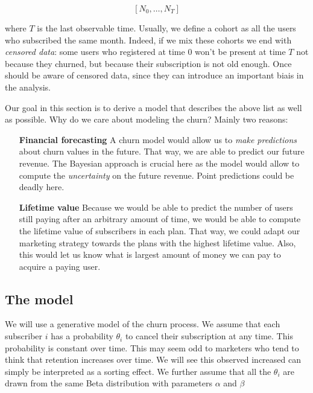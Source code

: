 \documentclass{tufte-book}
\begin{document}
\begin{equation}
  \left[N_0, \dots, N_T \right]
\end{equation}

where $T$ is the last observable time. Usually, we define a cohort as all the users who subscribed the same
month. Indeed, if we mix these cohorts we end with \textit{censored data}: some users who registered at time $0$
won't be present at time $T$ not because they churned, but because their subscription is not old enough. Once
should be aware of censored data, since they can introduce an important biais in the analysis.

Our goal in this section is to derive a model that describes the above list as well as possible. Why do we
care about modeling the churn? Mainly two reasons:

\begin{itemize}
  \item[\textbf{Financial forecasting}] A churn model would allow us to \textit{make predictions} about churn
    values in the future. That way, we are able to predict our future revenue. The Bayesian approach is
    crucial here as the model would allow to compute the \textit{uncertainty} on the future revenue. Point 
    predictions could be deadly here.
  \item[\textbf{Lifetime value}] Because we would be able to predict the number of users still paying after an
    arbitrary amount of time, we would be able to compute the lifetime value of subscribers in each plan. That
    way, we could adapt our marketing strategy towards the plans with the highest lifetime value. Also, this
    would let us know what is largest amount of money we can pay to acquire a paying user.
\end{itemize}

    \subsection{The model}%
    \label{sub:the_model}
 
We will use a generative model of the churn process. We assume that each subscriber $i$ has a probability
$\theta_i$ to cancel their subscription at any time. This probability is constant over time. This may seem odd
to marketers who tend to think that retention increases over time. We will see this observed increased can
simply be interpreted as a sorting effect.
We further assume that all the $\theta_i$ are drawn from the same Beta distribution with parameters $\alpha$
and $\beta$
\end{document}
